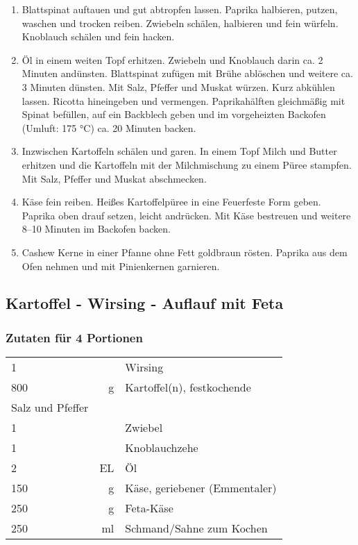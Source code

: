 \begin{enumerate}
    \item Blattspinat auftauen und gut abtropfen lassen. Paprika halbieren, putzen, waschen und trocken reiben. Zwiebeln schälen, halbieren und fein würfeln. Knoblauch schälen und fein hacken. 
    \item Öl in einem weiten Topf erhitzen. Zwiebeln und Knoblauch darin ca. 2 Minuten andünsten. Blattspinat zufügen mit Brühe ablöschen und weitere ca. 3 Minuten dünsten. Mit Salz, Pfeffer und Muskat würzen. Kurz abkühlen lassen. Ricotta hineingeben und vermengen. Paprikahälften gleichmäßig mit Spinat befüllen, auf ein Backblech geben und im vorgeheizten Backofen (Umluft: 175 °C) ca. 20 Minuten backen. 
    \item Inzwischen Kartoffeln schälen und garen. In einem Topf Milch und Butter erhitzen und die Kartoffeln mit der Milchmischung zu einem Püree stampfen. Mit Salz, Pfeffer und Muskat abschmecken. 
    \item Käse fein reiben. Heißes Kartoffelpüree in eine Feuerfeste Form geben. Paprika oben drauf setzen, leicht andrücken. Mit Käse bestreuen und weitere 8–10 Minuten im Backofen backen. 
    \item Cashew Kerne in einer Pfanne ohne Fett goldbraun rösten. Paprika aus dem Ofen nehmen und mit Pinienkernen garnieren. 
    
    
\end{enumerate}

\subsection{Kartoffel - Wirsing - Auflauf mit Feta}\label{sec:WirstingAuflauf}

\subsubsection*{Zutaten für 4 Portionen}
\begin{tabular}{lrl}
    1                &    & Wirsing                       \\
    800              &  g & Kartoffel(n), festkochende    \\
    Salz und Pfeffer &  &\\
    1                &    & Zwiebel                       \\
    1                &    & Knoblauchzehe                 \\
    2                & EL & Öl                            \\
    150              &  g & Käse, geriebener (Emmentaler) \\
    250              &  g & Feta-Käse                     \\
    250              & ml & Schmand/Sahne zum Kochen
\end{tabular} 

